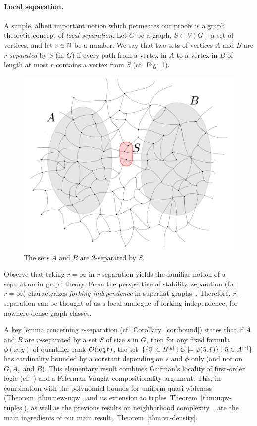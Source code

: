 \vspace{-1mm}
\paragraph{Local separation.}
A simple, albeit important notion which permeates our proofs
is a graph theoretic concept of \emph{local separation}.
Let $G$ be a graph, $S\subset V(G)$ a set of vertices,
and let $r\in \mathbb{N}$ be a number. We say that two  sets of vertices $A$ and $B$  are \emph{$r$-separated} by $S$ (in $G$) if every path from a vertex in $A$ to a vertex in $B$
of length at most $r$ contains a vertex from $S$ (cf.~Fig.~\ref{fig:sep}).
 \begin{figure}[h!]
 	\centering
 		\includegraphics[scale=0.3,page=1]{pics}
 	\caption{The sets $A$ and $B$ are $2$-separated by $S$.
 	}
 	\label{fig:sep}
 \end{figure}
Observe that taking $r=\infty$ in $r$-separation yields the familiar notion of a separation in graph theory.
From the perspective of stability, separation (for $r=\infty$) characterizes \emph{forking independence} in superflat graphs~\cite{ivanov}. Therefore,
$r$-separation can be thought of as a local analogue of forking independence, for nowhere dense graph classes.

A key lemma concerning $r$-separation (cf.~Corollary~\ref{cor:bound})
states that if $A$ and $B$ are $r$-separated by a set $S$ of size $s$
in $G$, then for any fixed formula $\phi(\bar x,\bar y)$ of quantifier
rank $\mathcal{O}(\log r)$, the set
$\{\{\bar{v}\ \in B^{|\bar y|} : G\models\varphi(\bar{u},\bar{v})\} : \bar{u}\in A^{|\bar x|}\}$
has cardinality bounded by a constant depending on $s$ and $\phi$ only
(and not on $G,A,$ and $B$).  This elementary result combines
Gaifman's locality of first-order logic (cf.~\cite{gaifman1982local})
and a Feferman-Vaught compositionality argument. This, in combination
with the polynomial bounds for uniform quasi-wideness
(Theorem~\ref{thm:new-uqw}, and its extension to
tuples~Theorem~\ref{thm:uqw-tuples}), as well as the previous results
on neighborhood
complexity~\cite{drange2016kernelization,eickmeyer2016neighborhood},
are the main ingredients of our main
result,~Theorem~\ref{thm:vc-density}.


